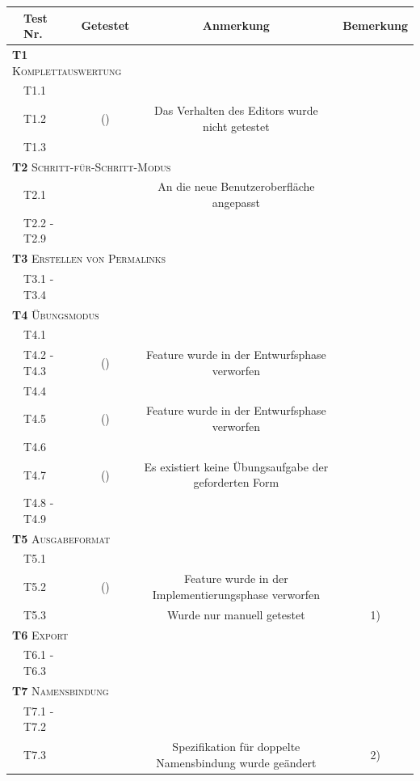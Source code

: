 \documentclass[parskip=full,11pt,openany]{scrreprt}
\newcommand{\cmark}{\ding{51}}%
\newcommand{\xmark}{\ding{55}}%
\begin{document}
\begin{table}[h]
	\centering
	\begin{tabular}{@{}ll|c|c|c@{}}
		\toprule
		&\textbf{Test Nr.} & \textbf{Getestet} &\textbf{Anmerkung} &\textbf{Bemerkung}\\ 
		\midrule
		\multicolumn{3}{l|}{\small \textsc{\textbf{T1} Komplettauswertung}} \\ 
		&T1.1 & \cmark & \\
		&T1.2 & (\cmark) & Das Verhalten des Editors wurde nicht getestet \\
		&T1.3 & \cmark & \\ 
		\multicolumn{4}{l}{\small \textsc{\textbf{T2} Schritt-für-Schritt-Modus}}\\ 
		&T2.1 & \cmark & An die neue Benutzeroberfläche angepasst \\
		&T2.2 - T2.9 & \cmark & \\
		\multicolumn{4}{l}{\small \textsc{\textbf{T3} Erstellen von Permalinks}}\\ 	
		&T3.1 - T3.4 & \cmark & \\
		\multicolumn{3}{l|}{\small \textsc{\textbf{T4} Übungsmodus}}\\ 
		&T4.1 & \cmark & \\
		&T4.2 - T4.3 & (\xmark) & Feature wurde in der Entwurfsphase verworfen \\
		&T4.4 & \cmark & \\
		&T4.5 & (\xmark) & Feature wurde in der Entwurfsphase verworfen \\
		&T4.6 & \cmark & \\
		&T4.7 & (\xmark) & Es existiert keine Übungsaufgabe der geforderten Form \\
		&T4.8 - T4.9 & \cmark & \\
		\multicolumn{3}{l|}{\small \textsc{\textbf{T5} Ausgabeformat}}\\ 
		&T5.1 & \cmark & \\
		&T5.2 & (\xmark) & Feature wurde in der Implementierungsphase verworfen\\
		&T5.3 & \xmark & Wurde nur manuell getestet & 1) \\ %
		\multicolumn{2}{l|}{\small \textsc{\textbf{T6} Export}} & &\\ 
		&T6.1 - T6.3 & \cmark & \\
		\multicolumn{3}{l|}{\small \textsc{\textbf{T7} Namensbindung}}\\ 
		&T7.1 - T7.2 & \cmark & \\
		&T7.3 & \cmark & Spezifikation für doppelte Namensbindung wurde geändert & 2) \\ %

\end{tabular}
\end{table}
\end{document}
